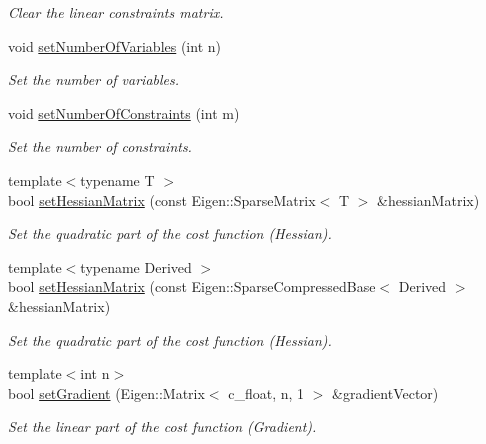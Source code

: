 \begin{DoxyCompactItemize}
\begin{DoxyCompactList}\small\item\em Clear the linear constraints matrix. \end{DoxyCompactList}\item 
void \mbox{\hyperlink{classOsqpEigen_1_1Data_abd09d8d70fcbaa8db833b87ca0bcbbab}{set\+Number\+Of\+Variables}} (int n)
\begin{DoxyCompactList}\small\item\em Set the number of variables. \end{DoxyCompactList}\item 
void \mbox{\hyperlink{classOsqpEigen_1_1Data_aea746479660e90e46fbf185dca91d936}{set\+Number\+Of\+Constraints}} (int m)
\begin{DoxyCompactList}\small\item\em Set the number of constraints. \end{DoxyCompactList}\item 
{\footnotesize template$<$typename T $>$ }\\bool \mbox{\hyperlink{classOsqpEigen_1_1Data_a58dfe4bfbb1b843736496eea9d0acfb7}{set\+Hessian\+Matrix}} (const Eigen\+::\+Sparse\+Matrix$<$ T $>$ \&hessian\+Matrix)
\begin{DoxyCompactList}\small\item\em Set the quadratic part of the cost function (Hessian). \end{DoxyCompactList}\item 
{\footnotesize template$<$typename Derived $>$ }\\bool \mbox{\hyperlink{classOsqpEigen_1_1Data_a9daa8e7e8f02a77a2589323290be7e9a}{set\+Hessian\+Matrix}} (const Eigen\+::\+Sparse\+Compressed\+Base$<$ Derived $>$ \&hessian\+Matrix)
\begin{DoxyCompactList}\small\item\em Set the quadratic part of the cost function (Hessian). \end{DoxyCompactList}\item 
{\footnotesize template$<$int n$>$ }\\bool \mbox{\hyperlink{classOsqpEigen_1_1Data_a46b476556b8f71326c6827285f10b970}{set\+Gradient}} (Eigen\+::\+Matrix$<$ c\+\_\+float, n, 1 $>$ \&gradient\+Vector)
\begin{DoxyCompactList}\small\item\em Set the linear part of the cost function (Gradient). \end{DoxyCompactList}\item 

\end{DoxyCompactItemize}
